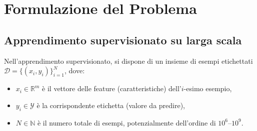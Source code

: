 \documentclass[a4paper,12pt]{article}
\newcommand{\R}{\mathbb{R}}
\begin{document}

\newpage
\section{Formulazione del Problema}\label{sec:formulazione}

\subsection{Apprendimento supervisionato su larga scala}

Nell'apprendimento supervisionato, si dispone di un insieme di esempi etichettati $\mathcal{D} = \{(x_i, y_i)\}_{i=1}^N$, dove:
\begin{itemize}
    \item $x_i \in \R^m$ \`e il vettore delle feature (caratteristiche) dell'$i$-esimo esempio,
    \item $y_i \in \mathcal{Y}$ \`e la corrispondente etichetta (valore da predire),
    \item $N \in \mathbb{N}$ \`e il numero totale di esempi, potenzialmente dell'ordine di $10^6$--$10^9$.
\end{itemize}
\end{document}
